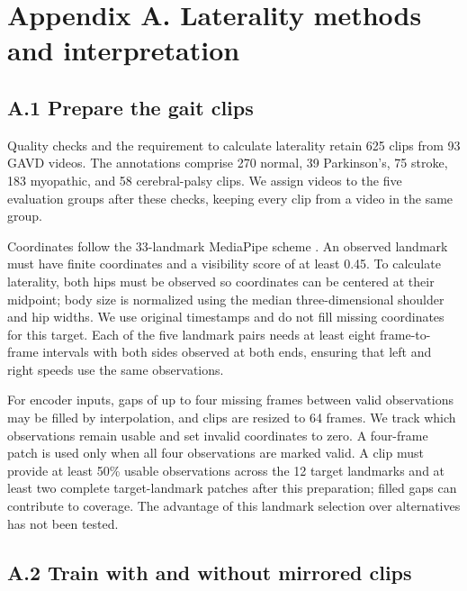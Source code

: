 \documentclass{article}
\begin{document}
\FloatBarrier\clearpage

\section{Appendix A. Laterality methods and
interpretation}\label{appendix-a.-laterality-methods-and-interpretation}

\subsection{A.1 Prepare the gait
clips}\label{a.1-prepare-the-gait-clips}

Quality checks and the requirement to calculate laterality retain 625
clips from 93 GAVD videos. The annotations comprise 270 normal, 39
Parkinson's, 75 stroke, 183 myopathic, and 58 cerebral-palsy clips. We
assign videos to the five evaluation groups after these checks, keeping
every clip from a video in the same group.

Coordinates follow the 33-landmark MediaPipe scheme
\citep{grishchenko2022blazepose}. An observed landmark must have finite
coordinates and a visibility score of at least 0.45. To calculate
laterality, both hips must be observed so coordinates can be centered at
their midpoint; body size is normalized using the median
three-dimensional shoulder and hip widths. We use original timestamps
and do not fill missing coordinates for this target. Each of the five
landmark pairs needs at least eight frame-to-frame intervals with both
sides observed at both ends, ensuring that left and right speeds use the
same observations.

For encoder inputs, gaps of up to four missing frames between valid
observations may be filled by interpolation, and clips are resized to 64
frames. We track which observations remain usable and set invalid
coordinates to zero. A four-frame patch is used only when all four
observations are marked valid. A clip must provide at least 50\% usable
observations across the 12 target landmarks and at least two complete
target-landmark patches after this preparation; filled gaps can
contribute to coverage. The advantage of this landmark selection over
alternatives has not been tested.

\subsection{A.2 Train with and without mirrored
clips}\label{a.2-train-with-and-without-mirrored-clips}
\end{document}
